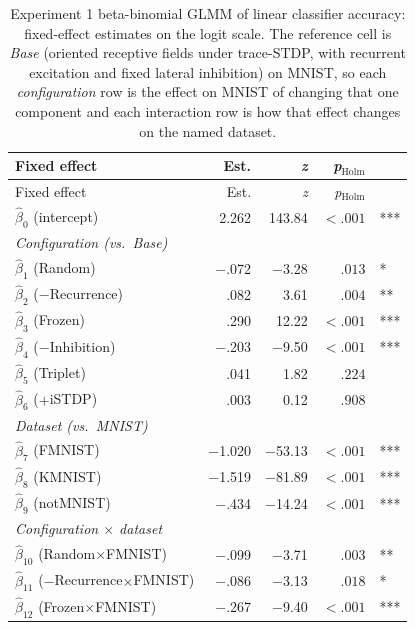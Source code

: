 \footnotesize{
\begin{longtable}{lrrrl}
    \caption{Experiment 1 beta-binomial GLMM of linear classifier accuracy: fixed-effect estimates
    on the logit scale. The reference cell is \textit{Base} (oriented receptive fields
    under trace-STDP, with recurrent excitation and fixed lateral inhibition) on MNIST,
    so each \textit{configuration} row is the effect on MNIST of changing that one
    component and each interaction row is how that effect changes on the named
    dataset.\label{tab:glmm_phase1}}\\
    \toprule
    \textbf{Fixed effect} & Est. & \textit{z} & \textit{p}$_{\text{Holm}}$ & \\
    \midrule
    \endfirsthead
    \toprule
    Fixed effect & Est. & \textit{z} & \textit{p}$_{\text{Holm}}$ & \\
    \midrule
    \endhead
    $\hat{\beta}_0$ (intercept) & 2.262 & 143.84 & $<.001$ & ***\\
    \multicolumn{5}{l}{\textit{Configuration (vs.\ Base)}}\\
    $\hat{\beta}_{1}$ (Random) & $-$.072 & $-$3.28 & $.013$ & *\\
    $\hat{\beta}_{2}$ ($-$Recurrence) & .082 & 3.61 & $.004$ & **\\
    $\hat{\beta}_{3}$ (Frozen) & .290 & 12.22 & $<.001$ & ***\\
    $\hat{\beta}_{4}$ ($-$Inhibition) & $-$.203 & $-$9.50 & $<.001$ & ***\\
    $\hat{\beta}_{5}$ (Triplet) & .041 & 1.82 & $.224$ & \\
    $\hat{\beta}_{6}$ ($+$iSTDP) & .003 & 0.12 & $.908$ & \\
    \multicolumn{5}{l}{\textit{Dataset (vs.\ MNIST)}}\\
    $\hat{\beta}_{7}$ (FMNIST) & $-$1.020 & $-$53.13 & $<.001$ & ***\\
    $\hat{\beta}_{8}$ (KMNIST) & $-$1.519 & $-$81.89 & $<.001$ & ***\\
    $\hat{\beta}_{9}$ (notMNIST) & $-$.434 & $-$14.24 & $<.001$ & ***\\
    \multicolumn{5}{l}{\textit{Configuration $\times$ dataset}}\\
    $\hat{\beta}_{10}$ (Random$\times$FMNIST) & $-$.099 & $-$3.71 & $.003$ & **\\
    $\hat{\beta}_{11}$ ($-$Recurrence$\times$FMNIST) & $-$.086 & $-$3.13 & $.018$ & *\\
    $\hat{\beta}_{12}$ (Frozen$\times$FMNIST) & $-$.267 & $-$9.40 & $<.001$ & ***\\

\end{longtable}}
